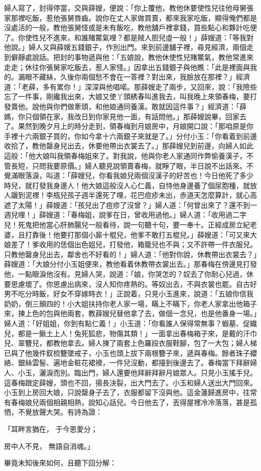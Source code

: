 婦人寫了，封得停當，交與薛嫂，便說：「你上覆他，教他休要使性兒往他母舅張家那裡吃飯，惹他張舅唇齒。說你在丈人家做買賣，都來我家吃飯，顯得俺們都是沒處活的一般，教他張舅怪或是未有飯吃，教他舖戶裡拿錢，買些點心和夥計吃便了。你使性兒不進來，和誰賭鱉氣哩？都是賊人胆兒虛一般！」薛嫂道：「等我對他說。」婦人又與薛嫂五錢銀子，作別出門。來到前邊舖子裡，尋見經濟，兩個走到僻靜處說話。把封的事物遞與他：「五娘說，教他休使性兒賭鱉氣，教他常進來走走；休往你張舅家吃飯去，惹人家怪。」因拿出五錢銀子與他瞧：「此是裡面與我的。漏眼不藏絲，久後你兩個愁不會在一答裡？對出來，我臉放在那裡？」經濟道：「老薛，多有累你！」深深與他唱喏。那薛嫂走了兩步，又回來，說：「我險些忘了一件事，剛纔我出來，大娘又使丫頭綉春叫進我去，叫我晚上來領春梅，要打發賣他。說他與你們做牽頭，和他娘通同養漢。敢就因這件事？」經濟道：「薛媽，你只個領在家，我改日到你家見他一面，有話問他。」那薛嫂說畢，回家去了。果然到晚夕月上的時分走到，領春梅到月娘房中，月娘開口說：「那咱原是你手裡十六兩銀子買的，你如今拿十六兩銀子來就是了。」分付小玉：「你看着到前邊收拾了，教他罄身兒出去，休要他帶出衣裳去了。」那薛嫂兒到前邊，向婦人如此這般：「他大娘叫我領春梅姐來了。對我說，他與你老人家通同作弊偷養漢子，不管長短，只問我要原價。」婦人聽見說領賣春梅，就睜了眼，半日說不出話來。不覺滿眼落淚，叫道：「薛嫂兒，你看我娘兒兩個沒漢子的好苦也！今日他死了多少時兒，就打發我身邊人！他大娘這般沒人心仁義，自恃他身邊養了個尿胞種，就放人躧到泥裡！李瓶兒孩子週半還死了哩，花巴痘疹未出，赤道天怎麼算計，就心高遮了太陽！」薛嫂道：「孩兒出了痘疹了沒曾？」婦人道：「何曾出來了？還不到一週兒哩！」薛嫂道：「春梅姐，說爹在日，曾收用過他。」婦人道：「收用過二字兒！死鬼把他當心肝肺腸兒一般看待，說一句聽十句，要一奉十。正經成房立紀老婆，且打靠後！他要打那個小廝十棍兒，他爹不敢打五棍兒。」薛嫂道：「可又來大娘差了！爹收用的恁個出色姐兒，打發他，箱籠兒也不與；又不許帶一件衣服兒。只教他罄身兒出去，鄰舍也不好看的！」婦人道：「他對你說，休教帶出衣裳去？」薛嫂道：「大娘分付小玉姐便來，教他看着休教帶衣裳出去。」那春梅在傍邊見打發他，一點眼淚他沒有。見婦人哭，說道：「娘，你哭怎的？奴去了你耐心兒過，休要思慮壞了。你思慮出病來，沒人知你疼熱的。等奴出去，不與衣裳也罷。自古好男不吃分時飯，好女不穿嫁時衣！」正說着，只見小玉進來，說道：「五娘你信我奶奶，倒三顛四的！小大姐扶持你老人家一場，瞞上不瞞下，你老人家拿出他箱子來，揀上色的包與他兩套，教薛嫂兒替他拿了去，做個一念兒，也是他番身一場。」婦人道：「好姐姐，你到有點仁義！」小玉道：「你看誰人保得常無事？蝦墓、促織兒，都是一鍬土上人！兔死狐悲，物傷其類！」一面拿出春梅箱子來，是戴的汗巾兒、翠簪兒，都教他拿去。婦人揀了兩套上色羅段衣服鞋腳，包了一大包；婦人梯已與了他幾件釵梳簪墜戒子，小玉也頭上拔下兩根簪子來，遞與春梅。餘者珠子纓絡、銀絲雲髻、遍地金粧花裙襖，一件兒沒動，都擡到後邊去了。春梅當下拜辭婦人、小玉，灑淚而別。臨出門，婦人還要他拜辭拜辭月娘眾人。只見小玉搖手兒。這春梅跟定薛嫂，頭也不回，揚長決裂，出大門去了。小玉和婦人送出大門回來。小玉到上房回大娘，只說罄身子去了，衣服都留下沒與他。這金蓮歸進房中，往常有春梅娘兒兩個相親相熱，說知心話兒。今日他去了，丟得屋裡冷冷落落，甚是孤恓，不覺放聲大哭。有詩為證：

「耳畔言猶在，  于今恩愛分；

房中人不見，  無語自消魂。」

畢竟未知後來如何，且聽下回分解：

